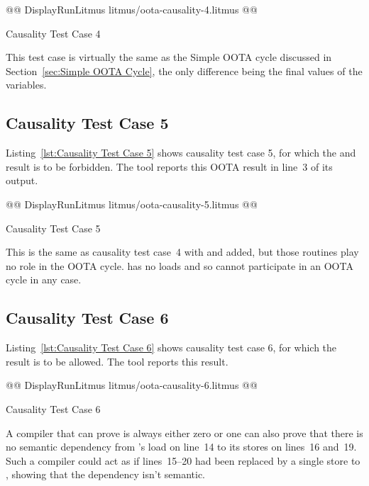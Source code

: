 \documentclass[10]{article}
\begin{document}
\begin{listing}[tbp]
@@ DisplayRunLitmus litmus/oota-causality-4.litmus @@
\caption{Causality Test Case 4}
\label{lst:Causality Test Case 4}
\end{listing}

This test case is virtually the same as the Simple OOTA cycle
discussed in Section~\ref{sec:Simple OOTA Cycle}, the only difference
being the final values of the variables.

\subsection{Causality Test Case 5}
\label{app:Causality Test Case 5}

Listing~\ref{lst:Causality Test Case 5}
shows causality test case 5, for which the  and 
result is to be forbidden.
The  tool reports this OOTA result in line~3 of its output.

\begin{listing}[tbp]
@@ DisplayRunLitmus litmus/oota-causality-5.litmus @@
\caption{Causality Test Case 5}
\label{lst:Causality Test Case 5}
\end{listing}

This is the same as causality test case~4 with  and 
added, but those routines play no role in the OOTA cycle.
 has no loads and so cannot participate in an OOTA cycle in
any case.

\subsection{Causality Test Case 6}
\label{app:Causality Test Case 6}

Listing~\ref{lst:Causality Test Case 6}
shows causality test case 6, for which the 
result is to be allowed.
The  tool reports this result.

\begin{listing}[tbp]
@@ DisplayRunLitmus litmus/oota-causality-6.litmus @@
\caption{Causality Test Case 6}
\label{lst:Causality Test Case 6}
\end{listing}

A compiler that can prove  is always either
zero or one can also prove that there is no semantic dependency
from 's load on line~14 to its stores on lines~16 and~19.
Such a compiler could act as if lines~15--20 had been replaced
by a single store to , showing that the dependency isn't
semantic.
\end{document}
